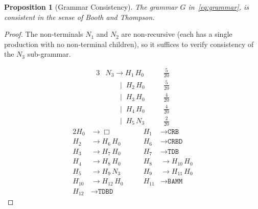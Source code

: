 \documentclass[11pt,a4paper]{article}
\newtheorem{proposition}[proposition]{Proposition}
\begin{document}
\begin{proposition}[Grammar Consistency]\label{prop:consistency}
The grammar $G$ in~\eqref{eq:grammar}, is consistent in the sense of Booth and
Thompson.
\end{proposition}

\begin{proof}
The non-terminals $N_1$ and $N_2$ are non-recursive (each has a single
production with no non-terminal children), so it suffices to verify
consistency of the $N_3$ sub-grammar.

\begin{alignat*}{3}
  &N_3 \to H_1\, H_0       &&\quad \tfrac{5}{20}\\
  &\phantom{N_3} \;\;\mid\; H_2\, H_0 &&\quad \tfrac{5}{20} \\
  &\phantom{N_3} \;\;\mid\; H_3\, H_0 &&\quad \tfrac{4}{20} \\
  &\phantom{N_3} \;\;\mid\; H_4\, H_0 &&\quad \tfrac{4}{20} \\
  &\phantom{N_3} \;\;\mid\; H_5\, N_3 &&\quad \tfrac{2}{20}
\end{alignat*}
\vspace{-1em}
\begin{alignat*}{2}
  H_0 &\to \Box
  &\qquad H_1 &\to \texttt{CRB} \\
  H_2 &\to H_6\, H_0
  &\qquad H_6 &\to \texttt{CRBD} \\
  H_3 &\to H_7\, H_0
  &\qquad H_7 &\to \texttt{TDB} \\
  H_4 &\to H_8\, H_0
  &\qquad H_8 &\to H_{10}\, H_0 \\
  H_5 &\to H_9\, N_3
  &\qquad H_9 &\to H_{11}\, H_0 \\
  H_{10} &\to H_{12}\, H_0
  &\qquad H_{11} &\to \texttt{BAMM} \\
  H_{12} &\to \texttt{TDBD}
\end{alignat*}


\end{proof}
\end{document}
